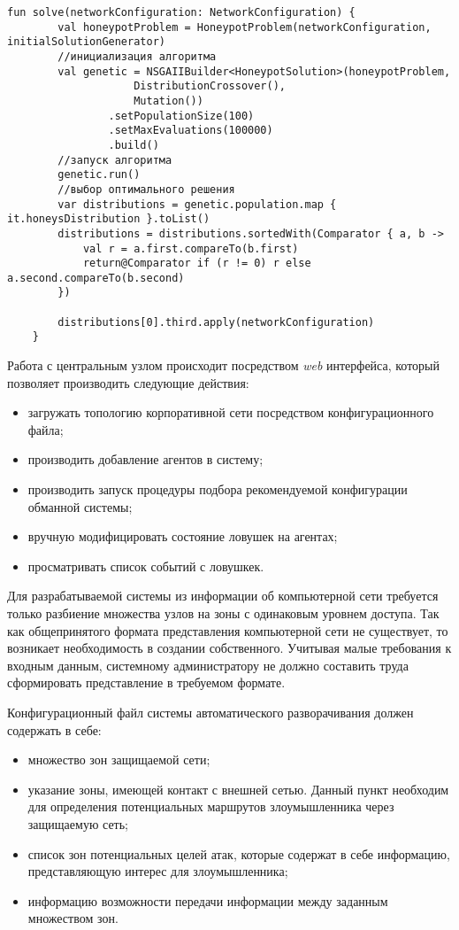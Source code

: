 \begin{lstlisting}[style=kotlinstyle, label=lst:crossover]
	fun solve(networkConfiguration: NetworkConfiguration) {
	    val honeypotProblem = HoneypotProblem(networkConfiguration, initialSolutionGenerator)
	    //инициализация алгоритма
	    val genetic = NSGAIIBuilder<HoneypotSolution>(honeypotProblem,
	                DistributionCrossover(), 
	                Mutation())
	            .setPopulationSize(100)
	            .setMaxEvaluations(100000)
	            .build()
	    //запуск алгоритма
	    genetic.run()
	    //выбор оптимального решения
	    var distributions = genetic.population.map { it.honeysDistribution }.toList()
	    distributions = distributions.sortedWith(Comparator { a, b ->
	        val r = a.first.compareTo(b.first)
	        return@Comparator if (r != 0) r else a.second.compareTo(b.second)
	    })

	    distributions[0].third.apply(networkConfiguration)
	}
\end{lstlisting}

Работа с центральным узлом происходит посредством \textit{web} интерфейса, который позволяет производить следующие действия:
\begin{itemize}
	\item загружать топологию корпоративной сети посредством конфигурационного файла;
	\item производить добавление агентов в систему;
	\item производить запуск процедуры подбора рекомендуемой конфигурации обманной системы;
	\item вручную модифицировать состояние ловушек на агентах;
	\item просматривать список событий с ловушкек.
\end{itemize}

Для разрабатываемой системы из информации об компьютерной сети требуется только разбиение множества узлов на зоны с одинаковым уровнем доступа. Так как общепринятого формата представления компьютерной сети не существует, то возникает необходимость в создании собственного. Учитывая малые требования к входным данным, системному администратору не должно составить труда сформировать представление в требуемом формате.

Конфигурационный файл системы автоматического разворачивания должен содержать в себе:
\begin{itemize}
	\item множество зон защищаемой сети;
	\item указание зоны, имеющей контакт с внешней сетью. Данный пункт необходим для определения потенциальных маршрутов злоумышленника через защищаемую сеть;
	\item список зон потенциальных целей атак, которые содержат в себе информацию, представляющую интерес для злоумышленника;
	\item информацию возможности передачи информации между заданным множеством зон.
\end{itemize}

